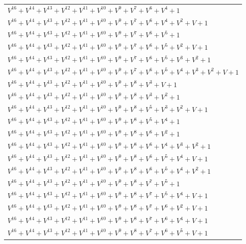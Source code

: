\documentclass[12pt]{article}
\begin{document}
\begin{adjustwidth}{-4cm}{}
\begin{center}
\begin{longtable}{|l|}
$V^{16}  +V^{14}  +V^{13}  +V^{12}  +V^{11}  +V^{10}  +V^{9}  +V^{7}  +V^{6}  +V^{4}  + 1$ \\
$V^{16}  +V^{14}  +V^{13}  +V^{12}  +V^{11}  +V^{10}  +V^{9}  +V^{7}  +V^{6}  +V^{4}  +V^{2}  + V + 1$ \\
$V^{16}  +V^{14}  +V^{13}  +V^{12}  +V^{11}  +V^{10}  +V^{9}  +V^{7}  +V^{6}  +V^{5}  + 1$ \\
$V^{16}  +V^{14}  +V^{13}  +V^{12}  +V^{11}  +V^{10}  +V^{9}  +V^{7}  +V^{6}  +V^{5}  +V^{2}  + V + 1$ \\
$V^{16}  +V^{14}  +V^{13}  +V^{12}  +V^{11}  +V^{10}  +V^{9}  +V^{7}  +V^{6}  +V^{5}  +V^{3}  +V^{2}  + 1$ \\
$V^{16}  +V^{14}  +V^{13}  +V^{12}  +V^{11}  +V^{10}  +V^{9}  +V^{7}  +V^{6}  +V^{5}  +V^{4}  +V^{3}  +V^{2}  + V + 1$ \\
$V^{16}  +V^{14}  +V^{13}  +V^{12}  +V^{11}  +V^{10}  +V^{9}  +V^{8}  +V^{3}  + V + 1$ \\
$V^{16}  +V^{14}  +V^{13}  +V^{12}  +V^{11}  +V^{10}  +V^{9}  +V^{8}  +V^{3}  +V^{2}  + 1$ \\
$V^{16}  +V^{14}  +V^{13}  +V^{12}  +V^{11}  +V^{10}  +V^{9}  +V^{8}  +V^{5}  +V^{3}  +V^{2}  + V + 1$ \\
$V^{16}  +V^{14}  +V^{13}  +V^{12}  +V^{11}  +V^{10}  +V^{9}  +V^{8}  +V^{5}  +V^{4}  + 1$ \\
$V^{16}  +V^{14}  +V^{13}  +V^{12}  +V^{11}  +V^{10}  +V^{9}  +V^{8}  +V^{6}  +V^{2}  + 1$ \\
$V^{16}  +V^{14}  +V^{13}  +V^{12}  +V^{11}  +V^{10}  +V^{9}  +V^{8}  +V^{6}  +V^{4}  +V^{3}  +V^{2}  + 1$ \\
$V^{16}  +V^{14}  +V^{13}  +V^{12}  +V^{11}  +V^{10}  +V^{9}  +V^{8}  +V^{6}  +V^{5}  +V^{4}  + V + 1$ \\
$V^{16}  +V^{14}  +V^{13}  +V^{12}  +V^{11}  +V^{10}  +V^{9}  +V^{8}  +V^{6}  +V^{5}  +V^{4}  +V^{2}  + 1$ \\
$V^{16}  +V^{14}  +V^{13}  +V^{12}  +V^{11}  +V^{10}  +V^{9}  +V^{8}  +V^{7}  +V^{5}  + 1$ \\
$V^{16}  +V^{14}  +V^{13}  +V^{12}  +V^{11}  +V^{10}  +V^{9}  +V^{8}  +V^{7}  +V^{5}  +V^{4}  + V + 1$ \\
$V^{16}  +V^{14}  +V^{13}  +V^{12}  +V^{11}  +V^{10}  +V^{9}  +V^{8}  +V^{7}  +V^{6}  +V^{2}  + V + 1$ \\
$V^{16}  +V^{14}  +V^{13}  +V^{12}  +V^{11}  +V^{10}  +V^{9}  +V^{8}  +V^{7}  +V^{6}  +V^{4}  + V + 1$ \\
$V^{16}  +V^{14}  +V^{13}  +V^{12}  +V^{11}  +V^{10}  +V^{9}  +V^{8}  +V^{7}  +V^{6}  +V^{5}  + V + 1$ \\

\end{longtable}
\end{center}
\end{adjustwidth}
\end{document}

